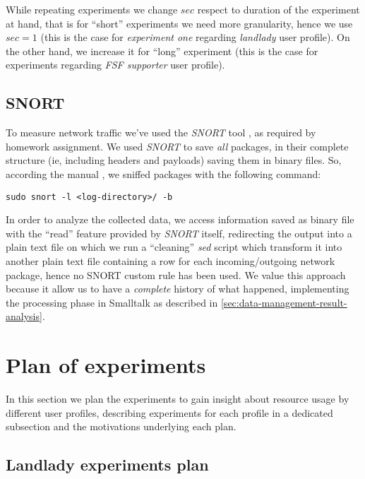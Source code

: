 \documentclass[10pt,a4paper]{article}
\begin{document}
    While repeating experiments we change $sec$ respect to duration of
    the experiment at hand, that is for ``short'' experiments we need
    more granularity, hence we use $sec = 1$ (this is the case for
    \emph{experiment one} regarding \emph{landlady} user profile). On
    the other hand, we increase it for ``long'' experiment (this is
    the case for experiments regarding \emph{FSF supporter} user
    profile).

    \subsection{SNORT} 
    To measure network traffic we've used the \emph{SNORT} tool
    \cite{SNORT}, as required by homework assignment. We used
    \emph{SNORT} to save \emph{all} packages, in their complete
    structure (ie, including headers and payloads) saving them in
    binary files.  So, according the manual \cite{SNORT-manual}, we
    sniffed packages with the following command:
\begin{verbatim}
sudo snort -l <log-directory>/ -b
\end{verbatim}
    In order to analyze the collected data, we access information
    saved as binary file with the ``read'' feature provided by
    \emph{SNORT} itself, redirecting the output into a plain text file
    on which we run a ``cleaning'' \emph{sed}\cite{sed} script which
    transform it into another plain text file containing a row for
    each incoming/outgoing network package, hence no SNORT custom rule
    has been used. We value this approach because it allow us to have
    a \emph{complete} history of what happened, implementing the
    processing phase in Smalltalk as described in
    \autoref{sec:data-management-result-analysis}.

    \newpage
    \section{Plan of experiments}
    \label{sec:plan-of-experiment}
    In this section we plan the experiments to gain insight about
    resource usage by different user profiles, describing experiments
    for each profile in a dedicated subsection and the motivations
    underlying each plan.

    \subsection{Landlady experiments plan}
\end{document}
